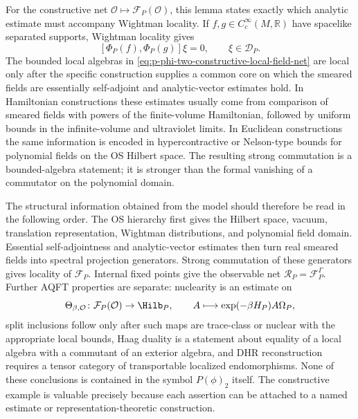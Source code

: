 For the constructive net
\(\mathcal O\mapsto\mathcal F_P(\mathcal O)\), this lemma states exactly
which analytic estimate must accompany Wightman locality.  If
\(f,g\in C_c^\infty(M,\mathbb R)\) have spacelike separated supports,
Wightman locality gives
\[
  [\Phi_P(f),\Phi_P(g)]\xi=0,\qquad \xi\in\mathcal D_P .
\]
The bounded local algebras in
\eqref{eq:p-phi-two-constructive-local-field-net} are local only after the
specific construction supplies a common core on which the smeared fields are
essentially self-adjoint and analytic-vector estimates hold.  In Hamiltonian
constructions these estimates usually come from comparison of
smeared fields with powers of the finite-volume Hamiltonian, followed by
uniform bounds in the infinite-volume and ultraviolet limits.  In Euclidean
constructions the same information is encoded in hypercontractive or
Nelson-type bounds for polynomial fields on the OS Hilbert space.  The
resulting strong commutation is a bounded-algebra statement; it is stronger
than the formal vanishing of a commutator on the polynomial domain.

The structural information obtained from the model should therefore be read
in the following order.  The OS hierarchy first gives the Hilbert space,
vacuum, translation representation, Wightman distributions, and polynomial
field domain.  Essential self-adjointness and analytic-vector estimates then
turn real smeared fields into spectral projection generators.  Strong
commutation of these generators gives locality of
\(\mathcal F_P\).  Internal fixed points give the observable net
\(\mathcal R_P=\mathcal F_P^\Gamma\).  Further AQFT properties are separate:
nuclearity is an estimate on
\[
  \Theta_{\beta,\mathcal O}\colon
  \mathcal F_P(\mathcal O)\to\Hilb_P,\qquad
  A\longmapsto \exp(-\beta H_P)A\Omega_P ,
\]
split inclusions follow only after such maps are trace-class or nuclear with
the appropriate local bounds, Haag duality is a statement about equality of a
local algebra with a commutant of an exterior algebra, and DHR reconstruction
requires a tensor category of transportable localized endomorphisms.  None of
these conclusions is contained in the symbol \(P(\phi)_2\) itself.  The
constructive example is valuable precisely because each assertion can be
attached to a named estimate or representation-theoretic construction.

